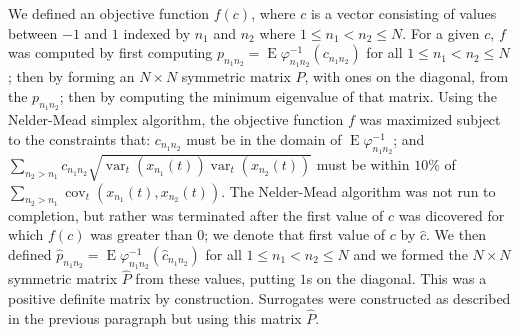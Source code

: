\documentclass[letterpaper,11pt]{article}
\newcommand{\E}{\operatorname{E}}
\newcommand{\var}{\operatorname{var}}
\newcommand{\cov}{\operatorname{cov}}
\begin{document}
We defined an objective function $f(c)$, where $c$ is a vector consisting of 
values between $-1$ and $1$ indexed by
$n_1$ and $n_2$ where $1 \leq n_1 < n_2 \leq N$. For a given $c$, $f$ was
computed by first computing $p_{n_1 n_2}=\E\varphi_{n_1 n_2}^{-1}(c_{n_1 n_2})$
for all $1 \leq n_1 < n_2 \leq N$; then by forming an $N \times N$ symmetric 
matrix $P$, with ones on the diagonal, from the $p_{n_1 n_2}$; then by computing
the minimum eigenvalue of that matrix. Using the Nelder-Mead simplex algorithm, the 
objective function $f$ was maximized subject to the constraints that: 
$c_{n_1 n_2}$ must be in the domain of $\E\varphi_{n_1 n_2}^{-1}$; and
$\sum_{n_2>n_1} c_{n_1 n_2} \sqrt{\var_t(x_{n_1}(t)) \var_t(x_{n_2}(t))}$ must be 
within $10\%$ of $\sum_{n_2>n_1} \cov_t(x_{n_1}(t),x_{n_2}(t))$.
The Nelder-Mead algorithm was not run to completion, but rather was terminated 
after the first value of $c$ was dicovered for which $f(c)$ was greater than $0$;
we denote that first value of $c$ by $\hat{c}$. We then defined 
$\hat{p}_{n_1 n_2}=\E\varphi_{n_1 n_2}^{-1}(\hat{c}_{n_1 n_2})$
for all $1 \leq n_1 < n_2 \leq N$ and we formed the $N \times N$ symmetric matrix 
$\hat{P}$ from these values, putting $1$s on the diagonal. This was a 
positive definite matrix by construction. Surrogates were constructed as 
described in the previous paragraph but using this matrix $\hat{P}$.





\end{document}
